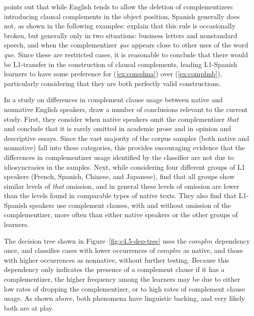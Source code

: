 \documentclass[main.tex]{subfiles}
\begin{document}
\citet{whitley:1986} points out that while English tends to allow the deletion of complementizers introducing clausal complements in the object position, Spanish generally does not, as shown in the following examples:
\citet[p. 473]{butt} explain that this rule is occasionally broken, but generally only in two situations: business letters and nonstandard speech, and when the complementizer \textit{que} appears close to other uses of the word \textit{que}. Since these are restricted cases, it is reasonable to conclude that there would be L1-transfer in the construction of clausal complements, leading L1-Spanish learners to have some preference for (\ref{ex:complma}) over (\ref{ex:complmb}), particularly considering that they are both perfectly valid constructions.

In a study on differences in complement clause usage between native and nonnative English speakers, \citet{biber:1998} draw a number of conclusions relevant to the current study. First, they consider when native speakers omit the complementizer \textit{that} and conclude that it is rarely omitted in academic prose and in opinion and descriptive essays. Since the vast majority of the corpus samples (both native and nonnative) fall into these categories, this provides encouraging evidence that the differences in complementizer usage identified by the classifier are not due to idiosyncrasies in the samples. Next, while considering four different groups of L1 speakers (French, Spanish, Chinese, and Japanese), \citeauthor{biber:1998} find that all groups show similar levels of \textit{that} omission, and in general these levels of omission are lower than the levels found in comparable types of native texts. They also find that L1-Spanish speakers use complement clauses, with and without omission of the complementizer, more often than either native speakers or the other groups of learners.

The decision tree shown in Figure~\ref{fig:c4.5-dep-tree} uses the $complm$ dependency once, and classifies cases with lower occurrences of $complm$ as native, and those with higher occurrences as nonnative, without further testing. Because this dependency only indicates the presence of a complement clause if it has a complementizer, the higher frequency among the learners may be due to either low rates of dropping the complementizer, or to high rates of complement clause usage. As shown above, both phenomena have linguistic backing, and very likely both are at play. 
\end{document}

